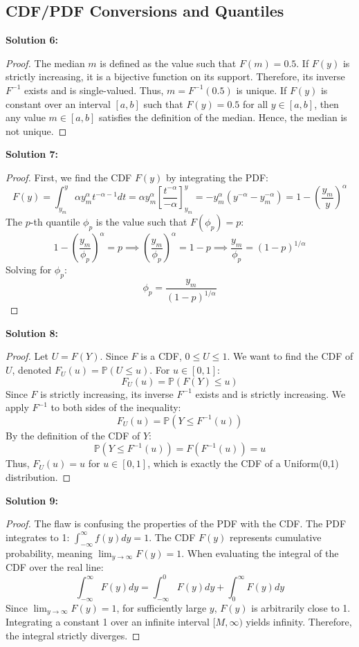 \documentclass[11pt, a4paper]{article}
\theoremstyle{definition}
\theoremstyle{remark}
\newcommand{\Prob}{\mathbb{P}}
\begin{document}
\subsection{CDF/PDF Conversions and Quantiles}

\textbf{Solution 6:}
\begin{proof}
The median $m$ is defined as the value such that $F(m) = 0.5$. 
If $F(y)$ is strictly increasing, it is a bijective function on its support. Therefore, its inverse $F^{-1}$ exists and is single-valued. Thus, $m = F^{-1}(0.5)$ is unique.
If $F(y)$ is constant over an interval $[a, b]$ such that $F(y) = 0.5$ for all $y \in [a, b]$, then any value $m \in [a, b]$ satisfies the definition of the median. Hence, the median is not unique.
\end{proof}

\textbf{Solution 7:}
\begin{proof}
First, we find the CDF $F(y)$ by integrating the PDF:
\[ F(y) = \int_{y_m}^y \alpha y_m^\alpha t^{-\alpha-1} dt = \alpha y_m^\alpha \left[ \frac{t^{-\alpha}}{-\alpha} \right]_{y_m}^y = -y_m^\alpha (y^{-\alpha} - y_m^{-\alpha}) = 1 - \left(\frac{y_m}{y}\right)^\alpha \]
The $p$-th quantile $\phi_p$ is the value such that $F(\phi_p) = p$:
\[ 1 - \left(\frac{y_m}{\phi_p}\right)^\alpha = p \implies \left(\frac{y_m}{\phi_p}\right)^\alpha = 1 - p \implies \frac{y_m}{\phi_p} = (1-p)^{1/\alpha} \]
Solving for $\phi_p$:
\[ \phi_p = \frac{y_m}{(1-p)^{1/\alpha}} \]
\end{proof}

\textbf{Solution 8:}
\begin{proof}
Let $U = F(Y)$. Since $F$ is a CDF, $0 \le U \le 1$. We want to find the CDF of $U$, denoted $F_U(u) = \Prob(U \le u)$.
For $u \in [0,1]$:
\[ F_U(u) = \Prob(F(Y) \le u) \]
Since $F$ is strictly increasing, its inverse $F^{-1}$ exists and is strictly increasing. We apply $F^{-1}$ to both sides of the inequality:
\[ F_U(u) = \Prob(Y \le F^{-1}(u)) \]
By the definition of the CDF of $Y$:
\[ \Prob(Y \le F^{-1}(u)) = F(F^{-1}(u)) = u \]
Thus, $F_U(u) = u$ for $u \in [0,1]$, which is exactly the CDF of a Uniform(0,1) distribution.
\end{proof}

\textbf{Solution 9:}
\begin{proof}
The flaw is confusing the properties of the PDF with the CDF. The PDF integrates to 1: $\int_{-\infty}^\infty f(y) dy = 1$. 
The CDF $F(y)$ represents cumulative probability, meaning $\lim_{y \to \infty} F(y) = 1$. 
When evaluating the integral of the CDF over the real line:
\[ \int_{-\infty}^\infty F(y) dy = \int_{-\infty}^0 F(y) dy + \int_0^\infty F(y) dy \]
Since $\lim_{y \to \infty} F(y) = 1$, for sufficiently large $y$, $F(y)$ is arbitrarily close to 1. Integrating a constant 1 over an infinite interval $[M, \infty)$ yields infinity. Therefore, the integral strictly diverges.
\end{proof}
\end{document}

